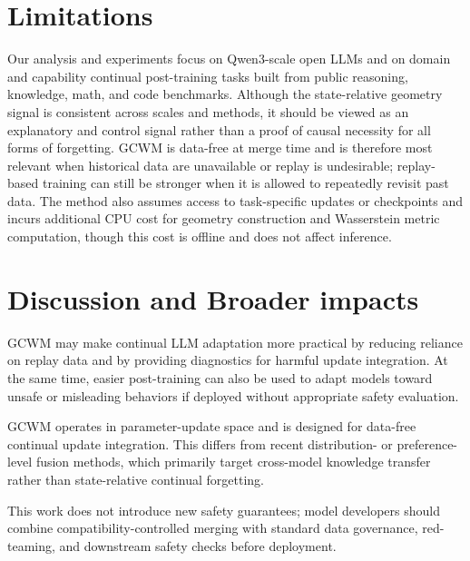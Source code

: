 \documentclass{article}
\begin{document}
\section*{Limitations}
\label{app:limitations}
Our analysis and experiments focus on Qwen3-scale open LLMs and on domain and capability continual post-training tasks built from public reasoning, knowledge, math, and code benchmarks.
Although the state-relative geometry signal is consistent across scales and methods, it should be viewed as an explanatory and control signal rather than a proof of causal necessity for all forms of forgetting.
GCWM is data-free at merge time and is therefore most relevant when historical data are unavailable or replay is undesirable; replay-based training can still be stronger when it is allowed to repeatedly revisit past data.
The method also assumes access to task-specific updates or checkpoints and incurs additional CPU cost for geometry construction and Wasserstein metric computation, though this cost is offline and does not affect inference.


\section{Discussion and Broader impacts}
\label{app:availability_compute_impact}


GCWM may make continual LLM adaptation more practical by reducing reliance on replay data and by providing diagnostics for harmful update integration.
At the same time, easier post-training can also be used to adapt models toward unsafe or misleading behaviors if deployed without appropriate safety evaluation.

GCWM operates in parameter-update space and is designed for data-free continual update integration.
This differs from recent distribution- \cite{wang2025infigfusion} or preference-level \cite{gu2025infifpo} fusion methods, which primarily target cross-model knowledge transfer rather than state-relative continual forgetting.

This work does not introduce new safety guarantees; model developers should combine compatibility-controlled merging with standard data governance, red-teaming, and downstream safety checks before deployment.
\end{document}
